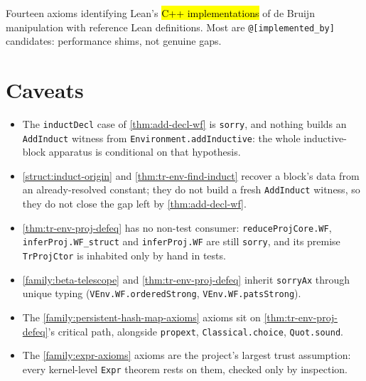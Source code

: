 \begin{definition}
\label{family:expr-axioms}
\leanok
{}

 Fourteen axioms identifying Lean's \hl{C++ implementations} of de Bruijn
manipulation with reference Lean definitions. Most are \texttt{@[implemented\_by]}
candidates: performance shims, not genuine gaps.
\end{definition}

\section*{Caveats}
\begin{itemize}
\item The \texttt{inductDecl} case of \ref{thm:add-decl-wf} is \texttt{sorry}, and nothing
builds an \texttt{AddInduct} witness from \texttt{Environment.addInductive}: the whole
inductive-block apparatus is conditional on that hypothesis.
\item \ref{struct:induct-origin} and \ref{thm:tr-env-find-induct} recover a block's data
from an already-resolved constant; they do not build a fresh \texttt{AddInduct} witness,
so they do not close the gap left by \ref{thm:add-decl-wf}.
\item \ref{thm:tr-env-proj-defeq} has no non-test consumer: \texttt{reduceProjCore.WF},
\texttt{inferProj.WF\_struct} and \texttt{inferProj.WF} are still \texttt{sorry}, and its
premise \texttt{TrProjCtor} is inhabited only by hand in tests.
\item \ref{family:beta-telescope} and \ref{thm:tr-env-proj-defeq} inherit
\texttt{sorryAx} through unique typing (\texttt{VEnv.WF.orderedStrong},
\texttt{VEnv.WF.patsStrong}).
\item The \ref{family:persistent-hash-map-axioms} axioms sit on \ref{thm:tr-env-proj-defeq}'s
critical path, alongside \texttt{propext}, \texttt{Classical.choice}, \texttt{Quot.sound}.
\item The \ref{family:expr-axioms} axioms are the project's largest trust assumption:
every kernel-level \texttt{Expr} theorem rests on them, checked only by inspection.
\end{itemize}
